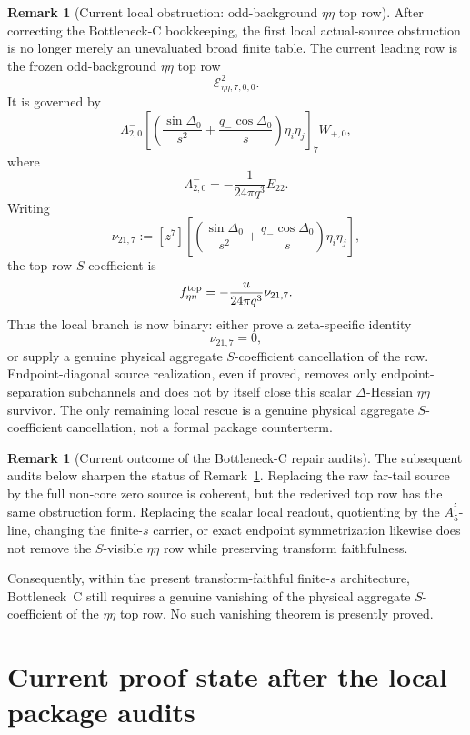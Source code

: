 \documentclass[11pt,a4paper]{amsart}
\theoremstyle{plain}
\theoremstyle{definition}
\newtheorem{remark}[theorem]{Remark}
\begin{document}
\begin{remark}[Current local obstruction: odd-background \(\eta\eta\) top row]
\label{rem:current-local-obstruction-etaeta-top-row}
After correcting the Bottleneck-C bookkeeping, the first local actual-source
obstruction is no longer merely an unevaluated broad finite table.  The
current leading row is the frozen odd-background \(\eta\eta\) top row
\[
\mathcal E^{2}_{\eta\eta;7,0,0}.
\]
It is governed by
\[
\Lambda^-_{2,0}
\left[
\left(
\frac{\sin\Delta_0}{s^2}
+
\frac{q_-\cos\Delta_0}{s}
\right)
\eta_i\eta_j
\right]_{7}
W_{+,0},
\]
where
\[
\Lambda^-_{2,0}
=
-\frac{1}{24\pi q^3}E_{22}.
\]
Writing
\[
\nu_{21,7}
:=
[z^7]\left[
\left(
\frac{\sin\Delta_0}{s^2}
+
\frac{q_-\cos\Delta_0}{s}
\right)
\eta_i\eta_j
\right],
\]
the top-row \(S\)-coefficient is
\[
f_{\eta\eta}^{\rm top}
=
-\frac{u}{24\pi q^3}\nu_{21,7}.
\]
Thus the local branch is now binary: either prove a zeta-specific identity
\[
\nu_{21,7}=0,
\]
or supply a genuine physical aggregate \(S\)-coefficient cancellation of the
row.  Endpoint-diagonal source realization, even if proved, removes only
endpoint-separation subchannels and does not by itself close this scalar
\(\Delta\)-Hessian \(\eta\eta\) survivor.  The only remaining local rescue is
a genuine physical aggregate \(S\)-coefficient cancellation, not a formal
package counterterm.
\end{remark}

\begin{remark}[Current outcome of the Bottleneck-C repair audits]
\label{rem:current-outcome-bottleneck-c-repair-audits}
The subsequent audits below sharpen the status of
Remark~\ref{rem:current-local-obstruction-etaeta-top-row}.  Replacing the raw
far-tail source by the full non-core zero source is coherent, but the
rederived top row has the same obstruction form.  Replacing the scalar local
readout, quotienting by the \(A_5^{\mathfrak f}\)-line, changing the
finite-\(s\) carrier, or exact endpoint symmetrization likewise does not remove
the \(S\)-visible \(\eta\eta\) row while preserving transform faithfulness.

Consequently, within the present transform-faithful finite-\(s\) architecture,
Bottleneck~C still requires a genuine vanishing of the physical aggregate
\(S\)-coefficient of the \(\eta\eta\) top row.  No such vanishing theorem is
presently proved.
\end{remark}

\section{Current proof state after the local package audits}
\label{sec:current-proof-state-after-local-audits}
\end{document}
